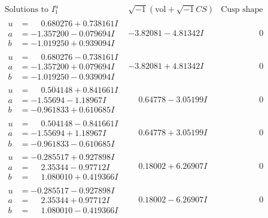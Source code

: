 \documentclass[1p]{elsarticle_modified}
\theoremstyle{definition}
\newcommand{\I}{\sqrt{-1}}
\begin{document}
$$\begin{array}{c|c|c}  
\text{Solutions to }I^u_{1}& \I (\text{vol} + \sqrt{-1}CS) & \text{Cusp shape}\\
 \hline 
\begin{aligned}
u &= \phantom{-}0.680276 + 0.738161 I \\
a &= -1.357200 - 0.079694 I \\
b &= -1.019250 + 0.939094 I\end{aligned}
 & -3.82081 - 4.81342 I & \phantom{-0.000000 } 0 \\ \hline\begin{aligned}
u &= \phantom{-}0.680276 - 0.738161 I \\
a &= -1.357200 + 0.079694 I \\
b &= -1.019250 - 0.939094 I\end{aligned}
 & -3.82081 + 4.81342 I & \phantom{-0.000000 } 0 \\ \hline\begin{aligned}
u &= \phantom{-}0.504148 + 0.841661 I \\
a &= -1.55694 - 1.18967 I \\
b &= -0.961833 + 0.610685 I\end{aligned}
 & \phantom{-}0.64778 - 3.05199 I & \phantom{-0.000000 } 0 \\ \hline\begin{aligned}
u &= \phantom{-}0.504148 - 0.841661 I \\
a &= -1.55694 + 1.18967 I \\
b &= -0.961833 - 0.610685 I\end{aligned}
 & \phantom{-}0.64778 + 3.05199 I & \phantom{-0.000000 } 0 \\ \hline\begin{aligned}
u &= -0.285517 + 0.927898 I \\
a &= \phantom{-}2.35344 - 0.97712 I \\
b &= \phantom{-}1.080010 + 0.419366 I\end{aligned}
 & \phantom{-}0.18002 + 6.26907 I & \phantom{-0.000000 } 0 \\ \hline\begin{aligned}
u &= -0.285517 - 0.927898 I \\
a &= \phantom{-}2.35344 + 0.97712 I \\
b &= \phantom{-}1.080010 - 0.419366 I\end{aligned}
 & \phantom{-}0.18002 - 6.26907 I & \phantom{-0.000000 } 0 \\ \hline\begin{aligned}

\end{aligned}
\end{array}$$
\end{document}

